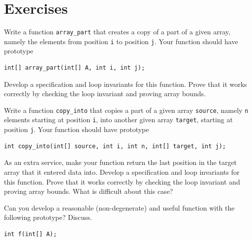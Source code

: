 \section{Exercises}
\label{sec:arrays:exercises}

\begin{exercise}
  Write a function \lstinline'array_part' that creates a copy of a
  part of a given array, namely the elements from position
  \lstinline'i' to position \lstinline'j'. Your function should have
  prototype
\begin{lstlisting}[language={[C0]C}]
int[] array_part(int[] A, int i, int j);
\end{lstlisting}
Develop a specification and loop invariants for this function.  Prove
that it works correctly by checking the loop invariant and proving
array bounds.
\end{exercise}

\begin{exercise}
  Write a function \lstinline'copy_into' that copies a part of a given
  array \lstinline'source', namely \lstinline'n' elements starting at
  position \lstinline'i', into another given array \lstinline'target',
  starting at position \lstinline'j'. Your function should have
  prototype
\begin{lstlisting}[language={[C0]C}]
int copy_into(int[] source, int i, int n, int[] target, int j);
\end{lstlisting}
As an extra service, make your function return the last position in
the target array that it entered data into.  Develop a specification
and loop invariants for this function.  Prove that it works correctly
by checking the loop invariant and proving array bounds.  What is
difficult about this case?
\end{exercise}


\begin{exercise}
  Can you develop a reasonable (non-degenerate) and useful function
  with the following prototype? Discuss.
\begin{lstlisting}[language={[C0]C}]
int f(int[] A);
\end{lstlisting}
\end{exercise}
